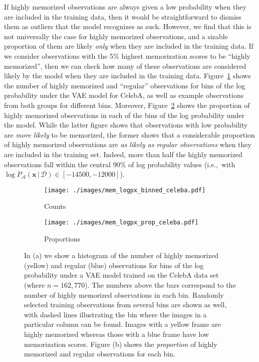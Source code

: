 \documentclass{article}
\newcommand{\bft}[1]{\mathbf{#1}}
\newcommand{\given}{\,|\,}
\begin{document}
If highly memorized observations are always given a low probability when they 
are included in the training data, then it would be straightforward to dismiss 
them as outliers that the model recognizes as such. However, we find that this 
is not universally the case for highly memorized observations, and a sizable 
proportion of them are likely \emph{only} when they are included in the 
training data. If we consider observations with the 5\% highest memorization 
scores to be ``highly memorized'', then we can check how many of these 
observations are considered likely by the model when they are included in the 
training data.  Figure~\ref{fig:celeba_logpx_bins} shows the number of highly 
memorized and ``regular'' observations for bins of the log probability under 
the VAE model for CelebA, as well as example observations from both groups for 
different bins. Moreover, Figure~\ref{fig:celeba_logpx_prop} shows the 
proportion of highly memorized observations in each of the bins of the log 
probability under the model.  While the latter figure shows that observations 
with low probability are \emph{more likely} to be memorized, the former shows 
that a considerable proportion of highly memorized observations are \emph{as 
	likely as regular observations} when they are included in the training 
set.  Indeed, more than half the highly memorized observations fall within the 
central 90\% of log probability values (i.e.,~with $\log 
P_{\mathcal{A}}(\bft{x} \given \mathcal{D}) \in [-14500, -12000]$).

\begin{figure}[tb]
	\centering
	\captionsetup[subfigure]{justification=centering}%
	\begin{subfigure}[b]{0.51\textwidth}
		\texttt{[image: ./images/mem\_logpx\_binned\_celeba.pdf]}
		\caption{Counts \label{fig:celeba_logpx_bins}}
	\end{subfigure}
	\qquad
	\begin{subfigure}[b]{0.43\textwidth}
		\texttt{[image: ./images/mem\_logpx\_prop\_celeba.pdf]}
		\caption{Proportions \label{fig:celeba_logpx_prop}}
	\end{subfigure}
	\caption{In (a) we show a histogram of the number of highly memorized 
		(\textcolor{MyYellow}{yellow}) and regular 
		(\textcolor{MyBlue}{blue}) observations for bins of the log 
		probability under a VAE model trained on the CelebA data set 
		(where $n = 162,770$).  The numbers above the bars correspond 
		to the number of highly memorized observations in each bin.  
		Randomly selected training observations from several bins are 
		shown as well, with dashed lines illustrating the bin where 
		the images in a particular column can be found. Images with a 
		yellow frame are highly memorized whereas those with a blue 
		frame have low memorization scores. Figure (b) shows the 
		\emph{proportion} of highly memorized and regular observations 
		for each bin.
		\label{fig:celeba_mem}}
\end{figure}
\end{document}
